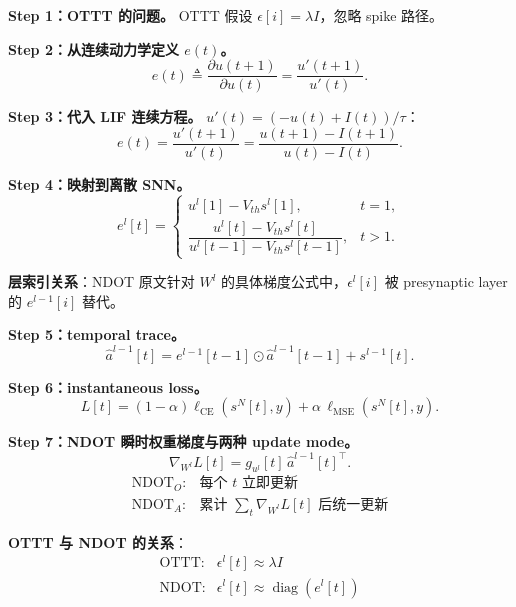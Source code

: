 \documentclass[journal,12pt,onecolumn]{IEEEtran}
\begin{document}
\textbf{Step 1：OTTT 的问题。} OTTT 假设 $\epsilon[i]=\lambda I$，忽略 spike 路径。

\textbf{Step 2：从连续动力学定义 $e(t)$。}
\begin{equation}
e(t)
\triangleq
\frac{\partial u(t+1)}{\partial u(t)}
=
\frac{u'(t+1)}{u'(t)}.
\end{equation}

\textbf{Step 3：代入 LIF 连续方程。} $u'(t)=(-u(t)+I(t))/\tau$：
\begin{equation}
e(t)=\frac{u'(t+1)}{u'(t)}=\frac{u(t+1)-I(t+1)}{u(t)-I(t)}.
\end{equation}

\textbf{Step 4：映射到离散 SNN。}
\begin{equation}
e^l[t]=
\begin{cases}
u^l[1]-V_{th}s^l[1], & t=1,\\[2mm]
\dfrac{u^l[t]-V_{th}s^l[t]}{u^l[t-1]-V_{th}s^l[t-1]}, & t>1.
\end{cases}
\end{equation}

\textbf{层索引关系}：NDOT 原文针对 $W^l$ 的具体梯度公式中，$\epsilon^l[i]$ 被 presynaptic layer 的 $e^{l-1}[i]$ 替代。

\textbf{Step 5：temporal trace。}
\begin{equation}
\hat a^{l-1}[t]=e^{l-1}[t-1]\odot\hat a^{l-1}[t-1]+s^{l-1}[t].
\end{equation}

\textbf{Step 6：instantaneous loss。}
\begin{equation}
L[t]=(1-\alpha)\ell_{\mathrm{CE}}(s^N[t],y)+\alpha\,\ell_{\mathrm{MSE}}(s^N[t],y).
\end{equation}

\textbf{Step 7：NDOT 瞬时权重梯度与两种 update mode。}
\begin{equation}
\nabla_{W^l}L[t]=g_{u^l}[t]\,\hat a^{l-1}[t]^\top.
\end{equation}
\begin{equation}
\begin{array}{cl}
\text{NDOT}_O: & \text{每个 }t\text{ 立即更新}\\[1mm]
\text{NDOT}_A: & \text{累计 }\sum_t\nabla_{W^l}L[t]\text{ 后统一更新}
\end{array}
\end{equation}

\textbf{OTTT 与 NDOT 的关系}：
\begin{equation}
\begin{array}{cl}
\text{OTTT:} & \epsilon^l[t]\approx \lambda I\\[1mm]
\text{NDOT:} & \epsilon^l[t]\approx \operatorname{diag}(e^l[t])
\end{array}
\end{equation}
\end{document}
